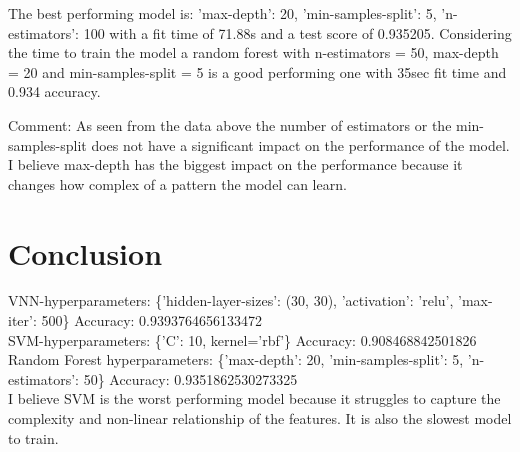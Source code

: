 \documentclass{article}
\begin{document}
The best performing model is: 'max-depth': 20, 'min-samples-split': 5, 'n-estimators': 100 with a fit time of 71.88s and a test score of 0.935205.
Considering the time to train the model a random forest with n-estimators = 50, max-depth = 20 and min-samples-split = 5 is a good performing one with 35sec fit time and 0.934 accuracy.

Comment:
As seen from the data above the number of estimators or the min-samples-split does not have a significant impact on the performance of the model.
I believe max-depth has the biggest impact on the performance because it changes how complex of a pattern the model can learn.

\section{Conclusion}
VNN-hyperparameters: \{'hidden-layer-sizes': (30, 30), 'activation': 'relu', 'max-iter': 500\}  Accuracy: 0.9393764656133472 \\
SVM-hyperparameters: \{'C': 10, kernel='rbf'\} Accuracy: 0.908468842501826 \\
Random Forest hyperparameters: \{'max-depth': 20, 'min-samples-split': 5, 'n-estimators': 50\} Accuracy: 0.9351862530273325 \\
I believe SVM is the worst performing
model because it struggles to capture the complexity and non-linear relationship
 of the features. It is also the slowest model to train. \\  
\end{document}
